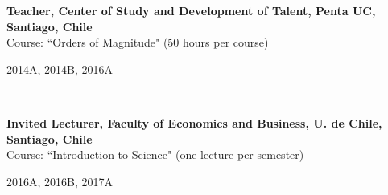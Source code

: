 \documentclass[12pt, a4paper]{article} %
\begin{document}
\begin{minipage}[t]{0.7\textwidth}
\begin{flushleft}%
  \setlength{\leftskip}{0.2cm}%
\textbf{Teacher, Center of Study and Development of Talent, Penta UC, Santiago, Chile}\\
Course: ``Orders of Magnitude" (50 hours per course)
\end{flushleft}
\end{minipage}
\begin{minipage}[t]{0.3\textwidth}
\hfill 2014A, 2014B, 2016A
\end{minipage}\\

\begin{minipage}[t]{0.7\textwidth}
\begin{flushleft}%
  \setlength{\leftskip}{0.2cm}%
\textbf{Invited Lecturer, Faculty of Economics and Business, U. de Chile, Santiago, Chile}\\
Course: ``Introduction to Science" (one lecture per semester)
\end{flushleft}
\end{minipage}
\begin{minipage}[t]{0.3\textwidth}
\hfill 2016A, 2016B, 2017A
\end{minipage}
\end{document}
